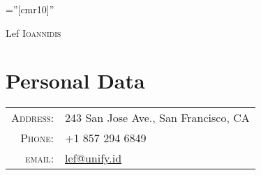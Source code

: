 \documentclass[lettersize,10pt]{article}
\begin{document}
\pagestyle{empty} %
\font\fb=''[cmr10]'' %

\par{\centering
		{\Huge Lef \textsc{Ioannidis}
	}\bigskip\par}

\section{Personal Data}

\begin{tabular}{rl}
    \textsc{Address:}   & 243 San Jose Ave., San Francisco, CA \\
    \textsc{Phone:}     & +1 857 294 6849\\
    \textsc{email:}     & \href{mailto:lef@unify.id}{lef@unify.id}
\end{tabular}

\end{document}

